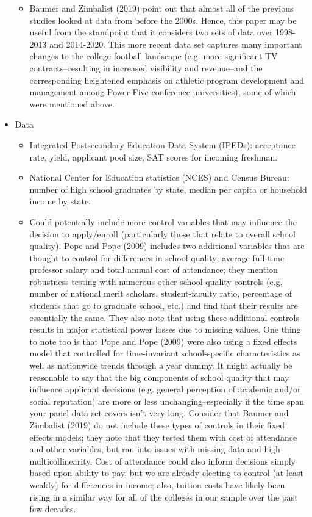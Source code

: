 \documentclass[12pt,english]{article}
\begin{document}
\begin{itemize}
\begin{itemize}
    \item Baumer and Zimbalist (2019) point out that almost all of the previous studies looked at data from before the 2000s. Hence, this paper may be useful from the standpoint that it considers two sets of data over 1998-2013 and 2014-2020. This more recent data set captures many important changes to the college football landscape (e.g. more significant TV contracts--resulting in increased visibility and revenue--and the corresponding heightened emphasis on athletic program development and management among Power Five conference universities), some of which were mentioned above.
    \end{itemize}
\item Data
    \begin{itemize}
    \item Integrated Postsecondary Education Data System (IPEDs): acceptance rate, yield, applicant pool size, SAT scores for incoming freshman.
    \item National Center for Education statistics (NCES) and Census Bureau: number of high school graduates by state, median per capita or household income by state.
    \item Could potentially include more control variables that may influence the decision to apply/enroll (particularly those that relate to overall school quality). Pope and Pope (2009) includes two additional variables that are thought to control for differences in school quality: average full-time professor salary and total annual cost of attendance; they mention robustness testing with numerous other school quality controls (e.g. number of national merit scholars, student-faculty ratio, percentage of students that go to graduate school, etc.) and find that their results are essentially the same. They also note that using these additional controls results in major statistical power losses due to missing values. One thing to note too is that Pope and Pope (2009) were also using a fixed effects model that controlled for time-invariant school-specific characteristics as well as nationwide trends through a year dummy. It might actually be reasonable to say that the big components of school quality that may influence applicant decisions (e.g. general perception of academic and/or social reputation) are more or less unchanging--especially if the time span your panel data set covers isn't very long. Consider that Baumer and Zimbalist (2019) do not include these types of controls in their fixed effects models; they note that they tested them with cost of attendance and other variables, but ran into issues with missing data and high multicollinearity. Cost of attendance could also inform decisions simply based upon ability to pay, but we are already electing to control (at least weakly) for differences in income; also, tuition costs have likely been rising in a similar way for all of the colleges in our sample over the past few decades.

\end{itemize}
\end{itemize}
\end{document}
